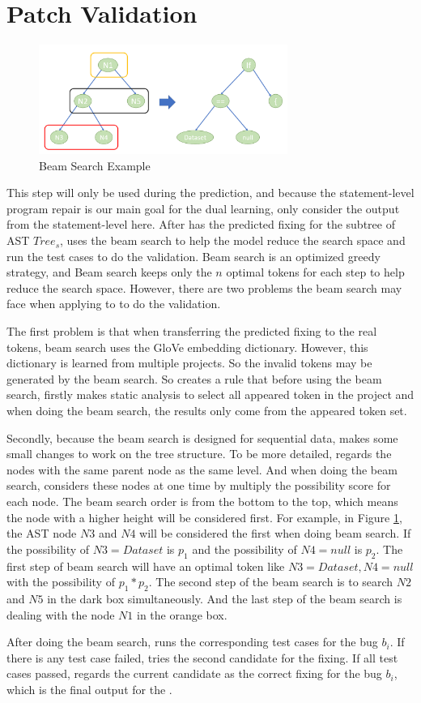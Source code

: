 \section{Patch Validation}

\begin{figure}[t]
	\centering
	\includegraphics[width=3.2in]{graphs/beam.png}
	\caption{Beam Search Example}
	\label{patch-validation}
\end{figure}

This step will only be used during the prediction, and because the statement-level program repair is our main goal for the dual learning, \tool only consider the output from the statement-level here. After \tool has the predicted fixing for the subtree of AST $Tree_s$, \tool uses the beam search to help the model reduce the search space and run the test cases to do the validation. Beam search is an optimized greedy strategy, and Beam search keeps only the $n$ optimal tokens for each step to help reduce the search space. However, there are two problems the beam search may face when applying to \tool to do the validation.

The first problem is that when transferring the predicted fixing to the real tokens, beam search uses the GloVe embedding dictionary. However, this dictionary is learned from multiple projects. So the invalid tokens may be generated by the beam search. So \tool creates a rule that before using the beam search, \tool firstly makes static analysis to select all appeared token in the project and when doing the beam search, the results only come from the appeared token set.

Secondly, because the beam search is designed for sequential data, \tool makes some small changes to work on the tree structure. To be more detailed, \tool regards the nodes with the same parent node as the same level. And when doing the beam search, \tool considers these nodes at one time by multiply the possibility score for each node. The beam search order is from the bottom to the top, which means the node with a higher height will be considered first. For example, in Figure \ref{patch-validation}, the AST node $N3$ and $N4$ will be considered the first when doing beam search. If the possibility of $N3=Dataset$ is $p_1$ and the possibility of $N4=null$ is $p_2$. The first step of beam search will have an optimal token like $N3=Dataset, N4=null$ with the possibility of $p_1*p_2$. The second step of the beam search is to search $N2$ and $N5$ in the dark box simultaneously. And the last step of the beam search is dealing with the node $N1$ in the orange box. 

After doing the beam search, \tool runs the corresponding test cases for the bug $b_i$. If there is any test case failed, \tool tries the second candidate for the fixing. If all test cases passed, \tool regards the current candidate as the correct fixing for the bug $b_i$, which is the final output for the \tool.